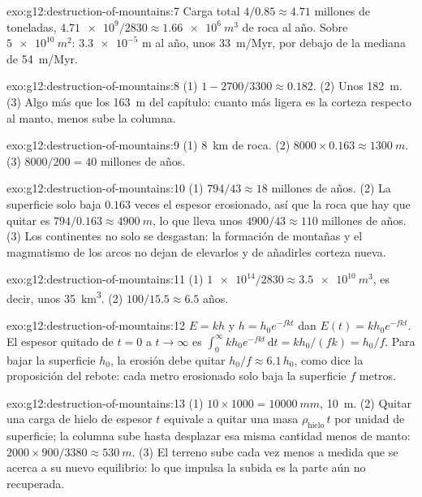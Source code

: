 \begin{solution}{exo:g12:destruction-of-mountains:7}
Carga total $4/0.85 \approx 4.71$ millones de toneladas, $\num{4.71e9}/2830 \approx
\qty{1.66e6}{m^3}$ de roca al año. Sobre $\qty{5e10}{m^2}$: $\num{3.3e-5}$ m
al año, unos \qty{33}{m/Myr}, por debajo de la mediana de \qty{54}{m/Myr}.
\end{solution}

\begin{solution}{exo:g12:destruction-of-mountains:8}
(1) $1 - 2700/3300 \approx 0.182$. (2) Unos \qty{182}{m}. (3) Algo más que
los \qty{163}{m} del capítulo: cuanto más ligera es la corteza respecto al
manto, menos sube la columna.
\end{solution}

\begin{solution}{exo:g12:destruction-of-mountains:9}
(1) \qty{8}{km} de roca. (2) $8000 \times 0.163 \approx \qty{1300}{m}$.
(3) $8000/200 = 40$ millones de años.
\end{solution}

\begin{solution}{exo:g12:destruction-of-mountains:10}
(1) $794/43 \approx 18$ millones de años. (2) La superficie solo baja $0.163$
veces el espesor erosionado, así que la roca que hay que quitar es $794/0.163
\approx \qty{4900}{m}$, lo que lleva unos $4900/43 \approx 110$ millones de
años. (3) Los continentes no solo se desgastan: la formación de montañas y el
magmatismo de los arcos no dejan de elevarlos y de añadirles corteza nueva.
\end{solution}

\begin{solution}{exo:g12:destruction-of-mountains:11}
(1) $\num{1e14}/2830 \approx \qty{3.5e10}{m^3}$, es decir, unos
\qty{35}{km^3}. (2) $100/15.5 \approx 6.5$ años.
\end{solution}

\begin{solution}{exo:g12:destruction-of-mountains:12}
$E = kh$ y $h = h_0 e^{-fkt}$ dan $E(t) = kh_0 e^{-fkt}$. El espesor
quitado de $t = 0$ a $t \to \infty$ es $\int_0^{\infty} kh_0
e^{-fkt}\,\mathrm{d}t = kh_0/(fk) = h_0/f$. Para bajar la superficie $h_0$,
la erosión debe quitar $h_0/f \approx 6.1\,h_0$, como dice la proposición del
rebote: cada metro erosionado solo baja la superficie $f$ metros.
\end{solution}

\begin{solution}{exo:g12:destruction-of-mountains:13}
(1) $10 \times 1000 = \qty{10000}{mm}$, \qty{10}{m}. (2) Quitar una carga de
hielo de espesor $t$ equivale a quitar una masa $\rho_{\text{hielo}}\,t$ por
unidad de superficie; la columna sube hasta desplazar esa misma cantidad
menos de manto: $2000 \times 900/3380 \approx \qty{530}{m}$. (3) El terreno
sube cada vez menos a medida que se acerca a su nuevo equilibrio: lo que
impulsa la subida es la parte aún no recuperada.
\end{solution}

